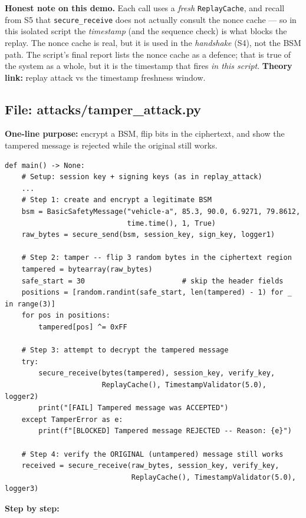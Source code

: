 \documentclass[11pt,a4paper]{report}
\begin{document}
\textbf{Honest note on this demo.} Each call uses a \emph{fresh}
\texttt{ReplayCache}, and recall from S5 that \texttt{secure\_receive} does not
actually consult the nonce cache --- so in this isolated script the
\emph{timestamp} (and the sequence check) is what blocks the replay. The nonce
cache is real, but it is used in the \emph{handshake} (S4), not the BSM path. The
script's final report lists the nonce cache as a defence; that is true of the
system as a whole, but it is the timestamp that fires \emph{in this script}.
\textbf{Theory link:} replay attack vs the timestamp freshness window.

\subsection{File: attacks/tamper\_attack.py}
\textbf{One-line purpose:} encrypt a BSM, flip bits in the ciphertext, and show
the tampered message is rejected while the original still works.
\begin{lstlisting}[style=py,caption={tamper\_attack.py --- the tamper attack (key parts).}]
def main() -> None:
    # Setup: session key + signing keys (as in replay_attack)
    ...
    # Step 1: create and encrypt a legitimate BSM
    bsm = BasicSafetyMessage("vehicle-a", 85.3, 90.0, 6.9271, 79.8612,
                             time.time(), 1, True)
    raw_bytes = secure_send(bsm, session_key, sign_key, logger1)

    # Step 2: tamper -- flip 3 random bytes in the ciphertext region
    tampered = bytearray(raw_bytes)
    safe_start = 30                       # skip the header fields
    positions = [random.randint(safe_start, len(tampered) - 1) for _ in range(3)]
    for pos in positions:
        tampered[pos] ^= 0xFF

    # Step 3: attempt to decrypt the tampered message
    try:
        secure_receive(bytes(tampered), session_key, verify_key,
                       ReplayCache(), TimestampValidator(5.0), logger2)
        print("[FAIL] Tampered message was ACCEPTED")
    except TamperError as e:
        print(f"[BLOCKED] Tampered message REJECTED -- Reason: {e}")

    # Step 4: verify the ORIGINAL (untampered) message still works
    received = secure_receive(raw_bytes, session_key, verify_key,
                              ReplayCache(), TimestampValidator(5.0), logger3)
\end{lstlisting}
\textbf{Step by step:}
\end{document}
